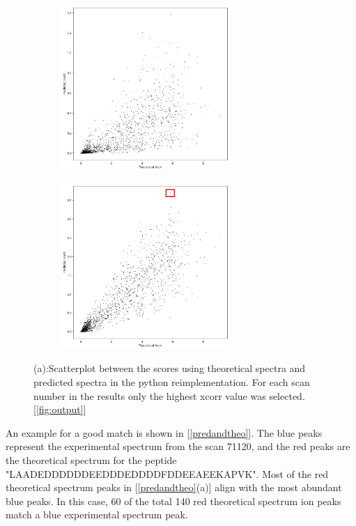 \documentclass[11pt]{article}
\begin{document}
\begin{figure}
\centering
\begin{subfigure}[b]{1\textwidth}
    \includegraphics[width=0.7\textwidth]{figs/scatterplot_predicted_theoretical.png}
   \caption{}
   \label{fig:scatterplot_predicted_theoretical} 
\end{subfigure}
\begin{subfigure}[b]{1\textwidth}
   \includegraphics[width=0.7\textwidth]{figs/scatterplot_windows.png}
   \caption{}
   \label{fig:scatterplot_windows}
\end{subfigure}
\caption{(a):Scatterplot between the scores using theoretical spectra and predicted spectra in the python reimplementation. For each scan number in the results only the highest xcorr value was selected. [\cref{fig:output}]}
\label{scatterplot_python}
\end{figure}
An example for a good match is shown in [\cref{predandtheo}]. The blue peaks represent the experimental spectrum from the scan 71120, and the red peaks are the theoretical spectrum for the peptide "LAADEDDDDDDEEDDDEDDDDFDDEEAEEKAPVK". Most of the red theoretical spectrum peaks in [\cref{predandtheo}(a)] align with the most abundant blue peaks. In this case, 60 of the total 140 red theoretical spectrum ion peaks match a blue experimental spectrum peak. 
\end{document}
